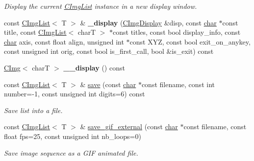 \begin{DoxyCompactItemize}
\begin{DoxyCompactList}\small\item\em Display the current \hyperlink{structcimg__library__suffixed_1_1CImgList}{C\+Img\+List} instance in a new display window. \end{DoxyCompactList}\item 
\mbox{\label{structcimg__library__suffixed_1_1CImgList_af514efa37d021bd02a95186531139a38}} 
const \hyperlink{structcimg__library__suffixed_1_1CImgList}{C\+Img\+List}$<$ T $>$ \& {\bfseries \+\_\+display} (\hyperlink{structcimg__library__suffixed_1_1CImgDisplay}{C\+Img\+Display} \&disp, const \hyperlink{classchar}{char} $\ast$const title, const \hyperlink{structcimg__library__suffixed_1_1CImgList}{C\+Img\+List}$<$ charT $>$ $\ast$const titles, const bool display\+\_\+info, const \hyperlink{classchar}{char} axis, const float align, unsigned int $\ast$const X\+YZ, const bool exit\+\_\+on\+\_\+anykey, const unsigned int orig, const bool is\+\_\+first\+\_\+call, bool \&is\+\_\+exit) const
\item 
\mbox{\label{structcimg__library__suffixed_1_1CImgList_aeb6a521c8b09a85000e5f39a1dbbc1d0}} 
\hyperlink{structcimg__library__suffixed_1_1CImg}{C\+Img}$<$ charT $>$ {\bfseries \+\_\+\+\_\+display} () const
\item 
const \hyperlink{structcimg__library__suffixed_1_1CImgList}{C\+Img\+List}$<$ T $>$ \& \hyperlink{structcimg__library__suffixed_1_1CImgList_a7186fe44f8d6ce58583e3177ff802445}{save} (const \hyperlink{classchar}{char} $\ast$const filename, const int number=-\/1, const unsigned int digits=6) const
\begin{DoxyCompactList}\small\item\em Save list into a file. \end{DoxyCompactList}\item 
const \hyperlink{structcimg__library__suffixed_1_1CImgList}{C\+Img\+List}$<$ T $>$ \& \hyperlink{structcimg__library__suffixed_1_1CImgList_a759ef20b53f1e507973dc53fcc2c7bb2}{save\+\_\+gif\+\_\+external} (const \hyperlink{classchar}{char} $\ast$const filename, const float fps=25, const unsigned int nb\+\_\+loops=0)
\begin{DoxyCompactList}\small\item\em Save image sequence as a G\+IF animated file. \end{DoxyCompactList}\item 

\end{DoxyCompactItemize}
